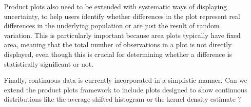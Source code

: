 \documentclass[journal]{vgtc}
\begin{document}
Product plots also need to be extended with systematic ways of displaying uncertainty, to help users identify whether differences in the plot represent real differences in the underlying population or are just the result of random variation. This is particularly important because area plots typically have fixed area, meaning that the total number of observations in a plot is not directly displayed, even though this is crucial for determining whether a difference is statistically significant or not.

Finally, continuous data is currently incorporated in a simplistic manner. Can we extend the product plots framework to include plots designed to show continuous distributions like the average shifted histogram \citep{scott:1985} or the kernel density estimate \citep{scott:1992}?




\end{document}
